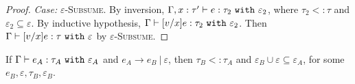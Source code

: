 \documentclass[acmsmall,review,anonymous]{acmart}\settopmatter{printfolios=true}
\begin{document}
\begin{proof}
\textit{Case:} \textsc{$\varepsilon$-Subsume}. By inversion, $ \Gamma, x:  \tau' \vdash  e:  \tau_2~\mathtt{with}~ \varepsilon_2$, where $ \tau_2 <:  \tau$ and $\varepsilon_2 \subseteq \varepsilon$. By inductive hypothesis, $ \Gamma \vdash [ v/x] e:  \tau_2~\mathtt{with}~ \varepsilon_2$. Then $ \Gamma \vdash [ v/x] e:  \tau~\mathtt{with}~ \varepsilon$ by \textsc{$\varepsilon$-Subsume}.

\end{proof}


\hrulefill


\begin{theorem}
If $\Gamma \vdash e_A: \tau_A~\mathtt{with}~ \varepsilon_A$ and $e_A \longrightarrow e_B~|~\varepsilon$, then $\tau_B <: \tau_A$ and $\varepsilon_B \cup \varepsilon \subseteq \varepsilon_A$, for some $e_B, \varepsilon, \tau_B, \varepsilon_B$.
\end{theorem}
\end{document}
